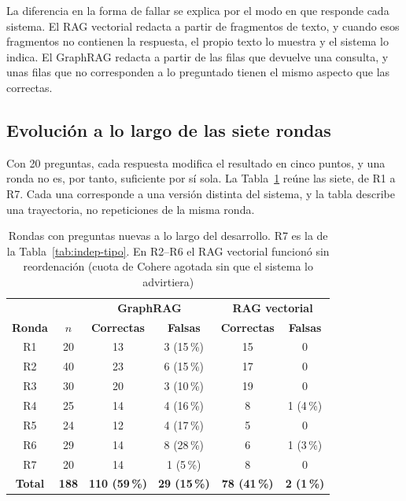 \documentclass[11pt, a4paper]{report}
\begin{document}
	La diferencia en la forma de fallar se explica por el modo en que responde
	cada sistema. El RAG vectorial redacta a partir de fragmentos de texto, y
	cuando esos fragmentos no contienen la respuesta, el propio texto lo muestra y el sistema lo indica. El GraphRAG redacta a partir de las filas
	que devuelve una consulta, y unas filas que no corresponden a lo preguntado
	tienen el mismo aspecto que las correctas.

	\subsection{Evolución a lo largo de las siete rondas}

	Con 20 preguntas, cada respuesta modifica el resultado en cinco puntos, y una ronda no es, por tanto, suficiente por sí sola. La
	Tabla~\ref{tab:indep-trayectoria} reúne las siete, de R1 a R7. Cada una
	corresponde a una versión distinta del sistema, y la tabla describe una trayectoria, no
	repeticiones de la misma ronda.

	\begin{table}[H]
		\centering
		\begin{tabular}{|c|c|c|c|c|c|}
			\hline
			\rowcolor{tabla-header}
			& & \multicolumn{2}{c|}{\textbf{GraphRAG}} & \multicolumn{2}{c|}{\textbf{RAG vectorial}} \\
			\rowcolor{tabla-header}
			\textbf{Ronda} & \textbf{$n$} & \textbf{Correctas} & \textbf{Falsas} & \textbf{Correctas} & \textbf{Falsas} \\
			\hline
			R1 & 20 & 13 & 3 (15\,\%) & 15 & 0 \\
			\hline
			\rowcolor{fila-alterna}
			R2 & 40 & 23 & 6 (15\,\%) & 17 & 0 \\
			\hline
			R3 & 30 & 20 & 3 (10\,\%) & 19 & 0 \\
			\hline
			\rowcolor{fila-alterna}
			R4 & 25 & 14 & 4 (16\,\%) & 8 & 1 (4\,\%) \\
			\hline
			R5 & 24 & 12 & 4 (17\,\%) & 5 & 0 \\
			\hline
			\rowcolor{fila-alterna}
			R6 & 29 & 14 & 8 (28\,\%) & 6 & 1 (3\,\%) \\
			\hline
			R7 & 20 & 14 & 1 (5\,\%) & 8 & 0 \\
			\hline
			\rowcolor{fila-alterna}
			\textbf{Total} & \textbf{188} & \textbf{110 (59\,\%)} & \textbf{29 (15\,\%)} & \textbf{78 (41\,\%)} & \textbf{2 (1\,\%)} \\
			\hline
		\end{tabular}
		\caption{Rondas con preguntas nuevas a lo largo del desarrollo. R7 es la de la Tabla~\ref{tab:indep-tipo}. En R2--R6 el RAG vectorial funcionó sin reordenación (cuota de Cohere agotada sin que el sistema lo advirtiera)}
		\label{tab:indep-trayectoria}
	\end{table}
\end{document}
